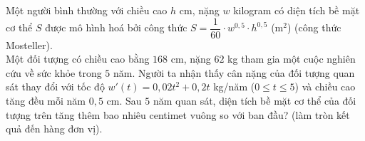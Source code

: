 \begin{ex}%
	Một người bình thường với chiều cao $h$ cm, nặng $w$ kilogram có diện tích bề mặt cơ thể $S$ được mô hình hoá bởi công thức $S=\dfrac{1}{60}\cdot w^{0{,}5}\cdot h^{0{,}5}$ (m$^2$) (công thức Mosteller).\\
	Một đối tượng có chiều cao bằng $168$ cm, nặng $62$ kg tham gia một cuộc nghiên cứu về sức khỏe trong $5$ năm. Người ta nhận thấy cân nặng của đối tượng quan sát thay đổi với tốc độ $w'(t)=0{,}02t^2+0{,}2t$ kg/năm ($0\le t\le 5$) và chiều cao tăng đều mỗi năm $0{,}5$ cm. Sau $5$ năm quan sát, diện tích bề mặt cơ thể của đối tượng trên tăng thêm bao nhiêu centimet vuông so với ban đầu? (làm tròn kết quả đến hàng đơn vị).
	\par{}
\end{ex}

